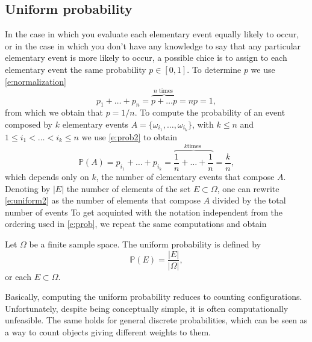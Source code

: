 	\subsection{Uniform probability }
	  In the case in which you evaluate each elementary event equally likely to occur, or in the case in which you don't have any knowledge to say that any particular elementary event is more likely to occur, a possible chice is to assign to each elementary event the same probability $p \in [0,1]$. To determine $p$ we use \eqref{e:normalization}    
	  \begin{equation}
		  \label{e:uniform1}
		  p_1 + \ldots + p_n =\overbrace{ p + \ldots p}^{n \text{ times }} = n p = 1, 
		  \end{equation}
		  from which we obtain that $p = 1/n$. To compute the probability of an event composed by $k$ elementary events $ A = \{\omega_{i_1}, \ldots, \omega_{i_k}\}$, with $k \leq n$ and $ 1\leq i_1 < \ldots < i_k\leq n $ we use \eqref{e:prob2} to obtain
		  \begin{equation}
			  \label{e:uniform2}
			  \mathbb P(A) = p_{i_1} + \ldots + p_{i_k} = \overbrace{\frac1n+ \ldots + \frac1n }^{k \text{times }} = \frac{k}{n},
		\end{equation}
		which depends only on $k$, the number of elementary events that compose $A$. 
	Denoting by $|E|$ the number of elements of the set $E \subset \Omega$, one can rewrite \eqref{e:uniform2}  as the number of elements that compose $A$ divided by the total number of events
		To get acquinted with the notation independent from the ordering used in \eqref{e:prob}, we repeat the same computations   
	and obtain 
	\begin{definition}
			\label{d:uniform}
			Let $\Omega$ be a finite sample space. The uniform probability is defined by 
				\begin{equation}
					\label{e:uniform}
					\mathbb P(E) = \frac{|E|}{|\Omega|},
				\end{equation}
				or each $E \subset \Omega$. 
	\end{definition}
	Basically, computing the uniform probability reduces to counting configurations. Unfortunately, despite being conceptually simple, it is often computationally unfeasible. The same holds for general discrete probabilities, which can be seen as a way to count objects giving different weights to them.
